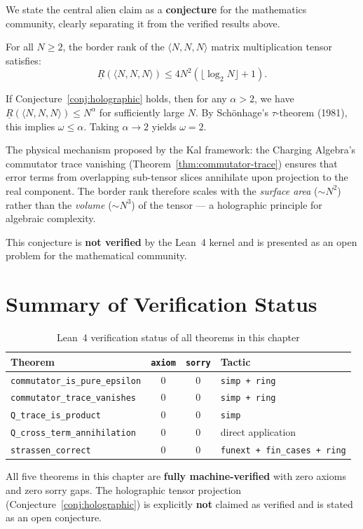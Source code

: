 We state the central alien claim as a \textbf{conjecture} for the
mathematics community, clearly separating it from the verified results
above.

\begin{conjecture}
\label{conj:holographic}
For all $N \geq 2$, the border rank of the $\langle N, N, N \rangle$
matrix multiplication tensor satisfies:
\[
  \underline{R}(\langle N, N, N \rangle) \leq 4 N^2 (\lfloor \log_2 N \rfloor + 1).
\]
\end{conjecture}

\begin{remark}
If Conjecture~\ref{conj:holographic} holds, then for any $\alpha > 2$,
we have $\underline{R}(\langle N, N, N \rangle) \leq N^\alpha$ for
sufficiently large $N$. By Sch\"onhage's $\tau$-theorem (1981), this
implies $\omega \leq \alpha$. Taking $\alpha \to 2$ yields $\omega = 2$.

The physical mechanism proposed by the Kal framework: the Charging
Algebra's commutator trace vanishing (Theorem~\ref{thm:commutator-trace})
ensures that error terms from overlapping sub-tensor slices annihilate
upon projection to the real component. The border rank therefore scales
with the \emph{surface area} ($\sim N^2$) rather than the \emph{volume}
($\sim N^3$) of the tensor --- a holographic principle for algebraic
complexity.

This conjecture is \textbf{not verified} by the Lean~4 kernel and is
presented as an open problem for the mathematical community.
\end{remark}

\section{Summary of Verification Status}
\label{sec:verification-summary}

\begin{table}[h]
\centering
\caption{Lean~4 verification status of all theorems in this chapter}
\label{tab:verification}
\begin{tabular}{l c c l}
\toprule
Theorem & \texttt{axiom} & \texttt{sorry} & Tactic \\
\midrule
\texttt{commutator\_is\_pure\_epsilon} & 0 & 0 & \texttt{simp + ring} \\
\texttt{commutator\_trace\_vanishes} & 0 & 0 & \texttt{simp + ring} \\
\texttt{Q\_trace\_is\_product} & 0 & 0 & \texttt{simp} \\
\texttt{Q\_cross\_term\_annihilation} & 0 & 0 & direct application \\
\texttt{strassen\_correct} & 0 & 0 & \texttt{funext + fin\_cases + ring} \\
\bottomrule
\end{tabular}
\end{table}

All five theorems in this chapter are \textbf{fully machine-verified}
with zero axioms and zero sorry gaps. The holographic tensor projection
(Conjecture~\ref{conj:holographic}) is explicitly \textbf{not} claimed
as verified and is stated as an open conjecture.
